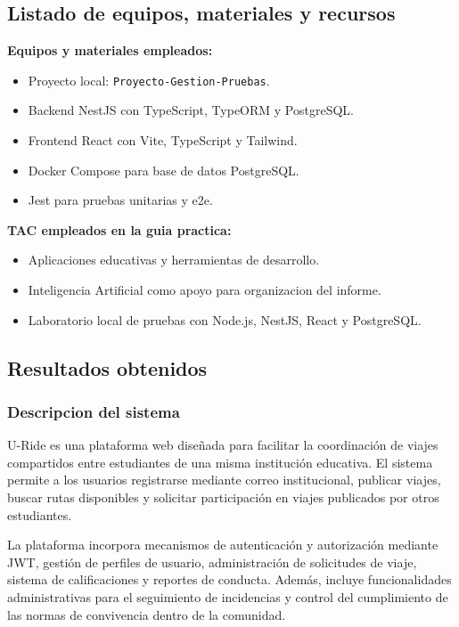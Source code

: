 \documentclass{article}
\begin{document}
\subsection{Listado de equipos, materiales y recursos}
\textbf{Equipos y materiales empleados:}
\begin{itemize}[leftmargin=*]
    \item Proyecto local: \texttt{Proyecto-Gestion-Pruebas}.
    \item Backend NestJS con TypeScript, TypeORM y PostgreSQL.
    \item Frontend React con Vite, TypeScript y Tailwind.
    \item Docker Compose para base de datos PostgreSQL.
    \item Jest para pruebas unitarias y e2e.
\end{itemize}

\textbf{TAC empleados en la guia practica:}
\begin{itemize}[leftmargin=*]
    \item[$\checkmark$] Aplicaciones educativas y herramientas de desarrollo.
    \item[$\checkmark$] Inteligencia Artificial como apoyo para organizacion del informe.
    \item[$\checkmark$] Laboratorio local de pruebas con Node.js, NestJS, React y PostgreSQL.
\end{itemize}



\subsection{Resultados obtenidos}

\subsubsection{Descripcion del sistema}

U-Ride es una plataforma web diseñada para facilitar la coordinación de viajes compartidos entre estudiantes de una misma institución educativa. El sistema permite a los usuarios registrarse mediante correo institucional, publicar viajes, buscar rutas disponibles y solicitar participación en viajes publicados por otros estudiantes.

La plataforma incorpora mecanismos de autenticación y autorización mediante JWT, gestión de perfiles de usuario, administración de solicitudes de viaje, sistema de calificaciones y reportes de conducta. Además, incluye funcionalidades administrativas para el seguimiento de incidencias y control del cumplimiento de las normas de convivencia dentro de la comunidad.
\end{document}
